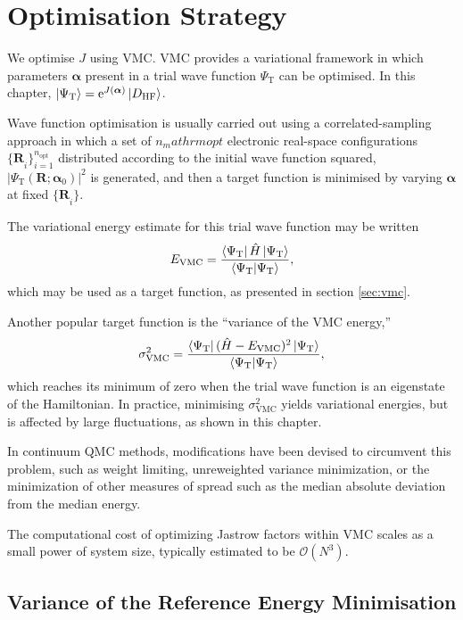\section{Optimisation Strategy}

We optimise $J$ using \gls{VMC}. VMC provides a variational framework in which parameters $\bm \alpha$ present in a trial wave function $\Psi_\mathrm{T}$ can be optimised. In this chapter, $\ket{\Psi_\mathrm{T}} = \mathrm{e}^{J(\bm\alpha)}\ket{D_\mathrm{HF}}$.

Wave function optimisation is usually carried out using a correlated-sampling approach in which a set of $n_mathrm{opt}$ electronic real-space configurations ${\{\bm R}_{i}\}_{i=1}^{n_\mathrm{opt}}$ distributed according to the initial wave function squared, $|\Psi_\mathrm{T}({\bm R}; {\bm \alpha}_0)|^2$ is generated, and then a target function is minimised by varying $\bm\alpha$ at fixed ${\{\bm R}_{i}\}$.

The variational energy estimate for this trial wave function may be written
\begin{equation}
    E_\mathrm{VMC} = \frac{\bra{\Psi_\mathrm{T}} \hat H \ket{\Psi_\mathrm{T}} }{ \braket{\Psi_\mathrm{T}}{\Psi_\mathrm{T}} },
\end{equation}
which may be used as a target function, as presented in section \ref{sec:vmc}.

Another popular target function is the ``variance of the VMC energy,''
\begin{equation}
\sigma_\mathrm{VMC}^2 = \frac{\bra{\Psi_\mathrm{T}}(\hat H - E_\mathrm{VMC})^2\ket{\Psi_\mathrm{T}}}{\braket{\Psi_\mathrm{T}}},
\end{equation}
which reaches its minimum of zero when the trial wave function is an eigenstate of the Hamiltonian. In practice, minimising $\sigma_\mathrm{VMC}^2$ yields variational energies, but is affected by large fluctuations, as shown in this chapter.

In continuum QMC methods, modifications have been devised to
circumvent this problem, such as weight limiting, unreweighted
variance minimization, or the minimization of other measures of spread
such as the median absolute deviation from the median energy.\supercite{needsVariational2020}

The computational cost of optimizing Jastrow factors within VMC scales
as a small power of system size, typically estimated to be ${\mathcal
O}(N^3)$.

\subsection{Variance of the Reference Energy Minimisation}

